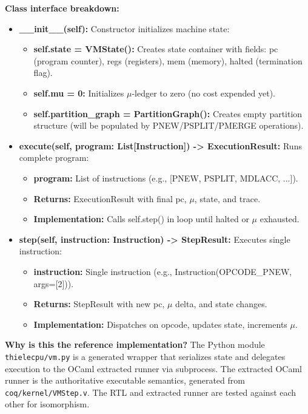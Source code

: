 \textbf{Class interface breakdown:}
\begin{itemize}
    \item \textbf{\_\_init\_\_(self):} Constructor initializes machine state:
    \begin{itemize}
        \item \textbf{self.state = VMState():} Creates state container with fields: pc (program counter), regs (registers), mem (memory), halted (termination flag).
        \item \textbf{self.mu = 0:} Initializes $\mu$-ledger to zero (no cost expended yet).
        \item \textbf{self.partition\_graph = PartitionGraph():} Creates empty partition structure (will be populated by PNEW/PSPLIT/PMERGE operations).
    \end{itemize}
    
    \item \textbf{execute(self, program: List[Instruction]) -> ExecutionResult:} Runs complete program:
    \begin{itemize}
        \item \textbf{program:} List of instructions (e.g., [PNEW, PSPLIT, MDLACC, ...]).
        \item \textbf{Returns:} ExecutionResult with final pc, $\mu$, state, and trace.
        \item \textbf{Implementation:} Calls self.step() in loop until halted or $\mu$ exhausted.
    \end{itemize}
    
    \item \textbf{step(self, instruction: Instruction) -> StepResult:} Executes single instruction:
    \begin{itemize}
        \item \textbf{instruction:} Single instruction (e.g., Instruction(OPCODE\_PNEW, args=[2])).
        \item \textbf{Returns:} StepResult with new pc, $\mu$ delta, and state changes.
        \item \textbf{Implementation:} Dispatches on opcode, updates state, increments $\mu$.
    \end{itemize}
\end{itemize}

\textbf{Why is this the reference implementation?} The Python module \texttt{thielecpu/vm.py} is a generated wrapper that serializes state and delegates execution to the OCaml extracted runner via subprocess. The extracted OCaml runner is the authoritative executable semantics, generated from \texttt{coq/kernel/VMStep.v}. The RTL and extracted runner are tested against each other for isomorphism.


